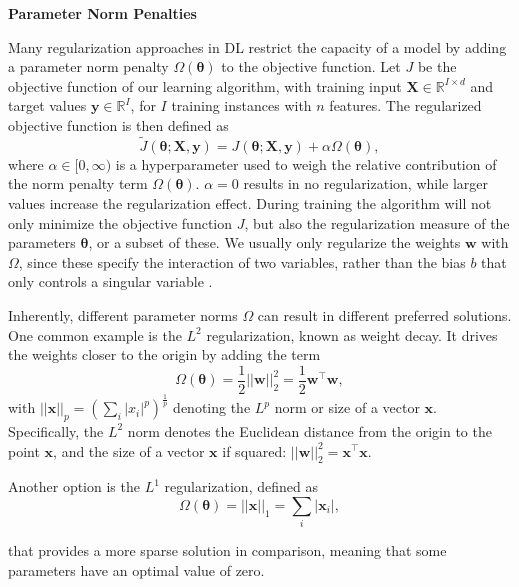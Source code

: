 \textbf{Parameter Norm Penalties}\par
Many regularization approaches in DL restrict the capacity of a model by adding a parameter norm penalty $\Omega(\boldsymbol{\theta})$ to the objective function. Let $J$ be the objective function of our learning algorithm, with training input $\mathbf{X} \in \mathbb{R}^{I\times d}$ and target values $\mathbf{y} \in \mathbb{R}^I$, for $I$ training instances with $n$ features. The regularized objective function is then defined as
\begin{equation}
    \tilde{J}(\boldsymbol{\theta}; \mathbf{X}, \mathbf{y}) = J(\boldsymbol{\theta}; \mathbf{X}, \mathbf{y}) + \alpha\Omega(\boldsymbol{\theta}),
\end{equation}
where $\alpha \in [0,\infty)$ is a hyperparameter used to weigh the relative contribution of the norm penalty term $\Omega(\boldsymbol{\theta})$. $\alpha=0$ results in no regularization, while larger values increase the regularization effect. During training the algorithm will not only minimize the objective function $J$, but also the regularization measure of the parameters $\boldsymbol{\theta}$, or a subset of these. We usually only regularize the weights $\mathbf{w}$ with $\Omega$, since these specify the interaction of two variables, rather than the bias $b$ that only controls a singular variable \cite{Goodfellow-et-al-2016}.

Inherently, different parameter norms $\Omega$ can result in different preferred solutions. One common example is the $L^2$ regularization, known as weight decay. It drives the weights closer to the origin by adding the term
\begin{equation}
    \Omega(\boldsymbol{\theta}) = \frac{1}{2}||\mathbf{w}||_2^2 = \frac{1}{2}\mathbf{w}^\top \mathbf{w},
\end{equation}
with $||\mathbf{x}||_p = (\sum_i |x_i|^p)^\frac{1}{p}$ denoting the $L^p$ norm or size of a vector $\mathbf{x}$. Specifically, the $L^2$ norm denotes the Euclidean distance from the origin to the point $\mathbf{x}$, and the size of a vector $\mathbf{x}$ if squared: $||\mathbf{w}||_2^2 = \mathbf{x}^\top \mathbf{x}$. \bigskip

Another option is the $L^1$ regularization, defined as
\begin{equation}
    \Omega(\boldsymbol{\theta}) = ||\mathbf{x}||_1 = \sum_i |\mathbf{x}_i|,
\end{equation}

that provides a more sparse solution in comparison, meaning that some parameters have an optimal value of zero. \bigskip

